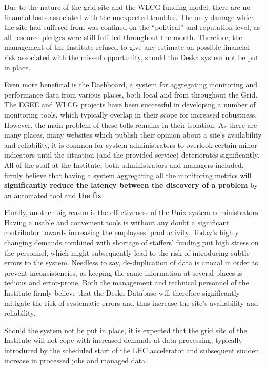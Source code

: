 \documentclass[12pt]{article}
\begin{document}
Due to the nature of the grid site and the WLCG funding model, there are no financial loses associated with the unexpected
troubles.  The only damage which the site had suffered from was confined on the ``political'' and reputation level, as all
resource pledges were still fulfilled throughout the month.  Therefore, the management of the Institute refused to give any
estimate on possible financial risk associated with the missed opportunity, should the Deska system not be put in place.

Even more beneficial is the Dashboard, a system for aggregating monitoring and performance data from various places, both local
and from throughout the Grid.  The EGEE and WLCG projects have been successful in developing a number of monitoring tools, which
typically overlap in their scope for increased robustness.  However, the main problem of these tolls remains in their isolation.
As there are many places, many websites which publish their opinion about a site's availability and reliability, it is common for
system administrators to overlook certain minor indicators until the situation (and the provided service) deteriorates
significantly.  All of the staff at the Institute, both administrators and managers included, firmly believe that having a system
aggregating all the monitoring metrics will {\bf significantly reduce the latency between the discovery of a problem} by an
automated tool and {\bf the fix}.

Finally, another big reason is the effectiveness of the Unix system administrators.  Having a usable and convenient tools is
without any doubt a significant contributor towards increasing the employees' productivity.  Today's highly changing demands
combined with shortage of staffers' funding put high stress on the personnel, which might subsequently lead to the risk of
introducing subtle errors to the system.  Needless to say, de-duplication of data is crucial in order to prevent inconsistencies,
as keeping the same information at several places is tedious and error-prone.
Both the management and technical personnel of the
Institute firmly believe that the Deska Database will therefore significantly mitigate the risk of systematic errors and thus
increase the site's availability and reliability.

Should the system not be put in place, it is expected that the grid site of the Institute will not cope with increased demands at
data processing, typically introduced by the scheduled start of the LHC accelerator and subsequent sudden increase in processed
jobs and managed data.
\end{document}
